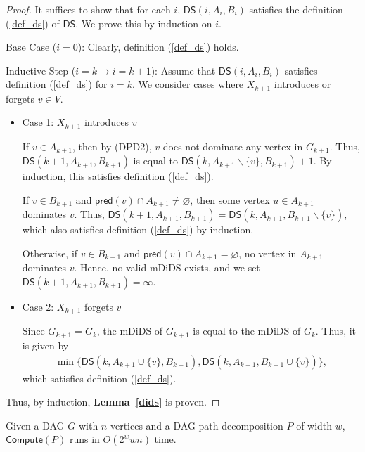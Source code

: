 \documentclass[runningheads]{llncs}
\theoremstyle{plain}
\theoremstyle{definition}
\begin{document}
\begin{proof}
    It suffices to show that for each $i$, $\mathsf{DS}(i, A_i, B_i)$ satisfies the definition (\ref{def_ds}) of $\mathsf{DS}$. We prove this by induction on $i$.
    
    Base Case ($i=0$): Clearly, definition (\ref{def_ds}) holds.
    
    Inductive Step ($i=k \rightarrow i=k+1$): Assume that $\mathsf{DS}(i, A_i, B_i)$ satisfies definition (\ref{def_ds}) for $i=k$. We consider cases where $X_{k+1}$ introduces or forgets $v \in V$.
    
    \begin{itemize}
        \item Case 1: $X_{k+1}$ introduces $v$
        
        If $v \in A_{k+1}$, then by (DPD2), $v$ does not dominate any vertex in $G_{k+1}$. Thus, $\mathsf{DS}(k+1, A_{k+1}, B_{k+1})$ is equal to $\mathsf{DS}(k, A_{k+1} \backslash \{v\}, B_{k+1}) + 1$. By induction, this satisfies definition (\ref{def_ds}).
        
        If $v \in B_{k+1}$ and $\mathsf{pred}(v) \cap A_{k+1} \neq \varnothing$, then some vertex $u \in A_{k+1}$ dominates $v$. Thus, $\mathsf{DS}(k+1, A_{k+1}, B_{k+1}) = \mathsf{DS}(k, A_{k+1}, B_{k+1} \backslash \{v\})$, which also satisfies definition (\ref{def_ds}) by induction.
        
        Otherwise, if $v \in B_{k+1}$ and $\mathsf{pred}(v) \cap A_{k+1} = \varnothing$, no vertex in $A_{k+1}$ dominates $v$. Hence, no valid mDiDS exists, and we set $\mathsf{DS}(k+1, A_{k+1}, B_{k+1}) = \infty$.
        
        \item Case 2: $X_{k+1}$ forgets $v$
        
        Since $G_{k+1} = G_k$, the mDiDS of $G_{k+1}$ is equal to the mDiDS of $G_k$. Thus, it is given by
        \begin{align*}
            \min \{\mathsf{DS}(k, A_{k+1} \cup \{v\}, B_{k+1}), \mathsf{DS}(k, A_{k+1}, B_{k+1} \cup \{v\})\},
        \end{align*}
        which satisfies definition (\ref{def_ds}).
    \end{itemize}
    Thus, by induction, \textbf{Lemma~\ref{dids}} is proven.
\end{proof}

\begin{lemma}
    Given a DAG $G$ with $n$ vertices and a DAG-path-decomposition $P$ of width $w$, $\mathsf{Compute}(P)$ runs in $O(2^w w n)$ time.
\end{lemma}
\end{document}
